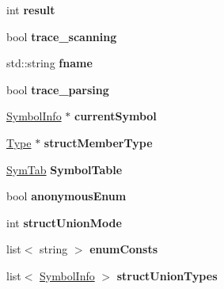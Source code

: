 \begin{DoxyCompactItemize}
\item 
\hypertarget{classCCompiler_ac83135baa1380874cf2e30bc1d3d9294}{int {\bfseries result}}\label{classCCompiler_ac83135baa1380874cf2e30bc1d3d9294}

\item 
\hypertarget{classCCompiler_aa9769e9f7417698ce18ab9c668650ad0}{bool {\bfseries trace\-\_\-scanning}}\label{classCCompiler_aa9769e9f7417698ce18ab9c668650ad0}

\item 
\hypertarget{classCCompiler_a60b1cadb0db77e19be3b13e80ceade72}{std\-::string {\bfseries fname}}\label{classCCompiler_a60b1cadb0db77e19be3b13e80ceade72}

\item 
\hypertarget{classCCompiler_a9959c74a24cffc0a33e981091b46ef01}{bool {\bfseries trace\-\_\-parsing}}\label{classCCompiler_a9959c74a24cffc0a33e981091b46ef01}

\item 
\hypertarget{classCCompiler_a5ec2690957bb31fb7942789d55ac9e76}{\hyperlink{structSymbolInfo}{Symbol\-Info} $\ast$ {\bfseries current\-Symbol}}\label{classCCompiler_a5ec2690957bb31fb7942789d55ac9e76}

\item 
\hypertarget{classCCompiler_a81717a338fc2dec88849f062ced197bd}{\hyperlink{classType}{Type} $\ast$ {\bfseries struct\-Member\-Type}}\label{classCCompiler_a81717a338fc2dec88849f062ced197bd}

\item 
\hypertarget{classCCompiler_a3315c6b835f8f910f175630d365592f0}{\hyperlink{classSymTab}{Sym\-Tab} {\bfseries Symbol\-Table}}\label{classCCompiler_a3315c6b835f8f910f175630d365592f0}

\item 
\hypertarget{classCCompiler_a89ebb609ccc09244cb053653e140f3af}{bool {\bfseries anonymous\-Enum}}\label{classCCompiler_a89ebb609ccc09244cb053653e140f3af}

\item 
\hypertarget{classCCompiler_aac65ea272c3c5420391022d16e01bc35}{int {\bfseries struct\-Union\-Mode}}\label{classCCompiler_aac65ea272c3c5420391022d16e01bc35}

\item 
\hypertarget{classCCompiler_a407df7e4274f95a2e2ec253d6622a610}{list$<$ string $>$ {\bfseries enum\-Consts}}\label{classCCompiler_a407df7e4274f95a2e2ec253d6622a610}

\item 
\hypertarget{classCCompiler_a01d0aa35be4c0654ff619801f4e5a916}{list$<$ \hyperlink{structSymbolInfo}{Symbol\-Info} $>$ {\bfseries struct\-Union\-Types}}\label{classCCompiler_a01d0aa35be4c0654ff619801f4e5a916}


\end{DoxyCompactItemize}
